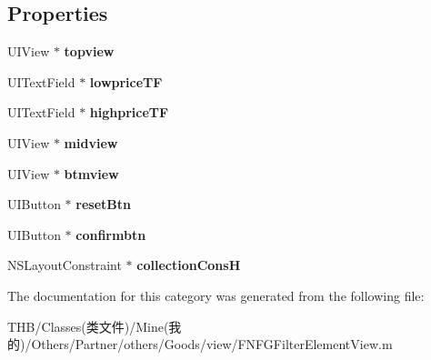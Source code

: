 \subsection*{Properties}
\begin{DoxyCompactItemize}
\item 
\mbox{\label{category_f_n_f_g_filter_element_view_07_08_ae3d37c5a30d201b40ec6901ac89299d9}} 
U\+I\+View $\ast$ {\bfseries topview}
\item 
\mbox{\label{category_f_n_f_g_filter_element_view_07_08_a0ad8eeb63103e4b140945d8a6f4b62fc}} 
U\+I\+Text\+Field $\ast$ {\bfseries lowprice\+TF}
\item 
\mbox{\label{category_f_n_f_g_filter_element_view_07_08_aa3270fa65b6b916435a7f1e9200dba78}} 
U\+I\+Text\+Field $\ast$ {\bfseries highprice\+TF}
\item 
\mbox{\label{category_f_n_f_g_filter_element_view_07_08_a5d30f486ea0d67794d08a99f635ac343}} 
U\+I\+View $\ast$ {\bfseries midview}
\item 
\mbox{\label{category_f_n_f_g_filter_element_view_07_08_a10903c4af8bf76a1de537275e3a558c8}} 
U\+I\+View $\ast$ {\bfseries btmview}
\item 
\mbox{\label{category_f_n_f_g_filter_element_view_07_08_aa0cb1cd421b0a08405dbbb4763982355}} 
U\+I\+Button $\ast$ {\bfseries reset\+Btn}
\item 
\mbox{\label{category_f_n_f_g_filter_element_view_07_08_ab2663aaeffbb4355cf2ca922c51e80eb}} 
U\+I\+Button $\ast$ {\bfseries confirmbtn}
\item 
\mbox{\label{category_f_n_f_g_filter_element_view_07_08_ab954ef8461620fcd5ac7685add4270a7}} 
N\+S\+Layout\+Constraint $\ast$ {\bfseries collection\+ConsH}
\end{DoxyCompactItemize}


The documentation for this category was generated from the following file\+:\begin{DoxyCompactItemize}
\item 
T\+H\+B/\+Classes(类文件)/\+Mine(我的)/\+Others/\+Partner/others/\+Goods/view/F\+N\+F\+G\+Filter\+Element\+View.\+m\end{DoxyCompactItemize}

